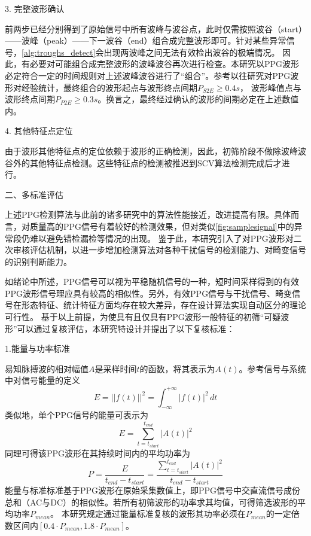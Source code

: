 3. 完整波形确认

前两步已经分别得到了原始信号中所有波峰与波谷点，此时仅需按照波谷（start）——波峰（peak）——下一波谷（end）组合成完整波形即可。针对某些异常信号，\autoref{alg:troughs_detect}会出现两波峰之间无法有效检出波谷的极端情况。
因此，有必要对可能组合成完整波形的波峰波谷再次进行检查。本研究以PPG波形必定符合一定的时间规则对上述波峰波谷进行了“组合”。参考以往研究对PPG波形对经验统计，最终组合的波形起点与波形终点间期$P_{S2E}\ge 0.4s$，
波形峰值点与波形终点间期$P_{P2E}\ge 0.3s$。换言之，最终经过确认的波形的间期必定在上述数值内。

4. 其他特征点定位

由于波形其他特征点的定位依赖于波形的正确检测，因此，初筛阶段不做除波峰波谷外的其他特征点检测。这些特征点的检测被推迟到SCV算法检测完成后才进行。

二、多标准评估

上述PPG检测算法与此前的诸多研究中的算法性能接近，改进提高有限。具体而言，对质量高的PPG信号有着较好的检测效果，但对类似\autoref{fig:samplesignal}中的异常段仍难以避免错检漏检等情况的出现。
鉴于此，本研究引入了对PPG波形对二次审核评估机制，以进一步增加检测算法对各种干扰信号的检测能力、对畸变信号的识别判断能力。

如绪论中所述，PPG信号可以视为平稳随机信号的一种，短时间采样得到的有效PPG波形信号理应具有较高的相似性\cite{Qiu2012}。另外，有效PPG信号与干扰信号、畸变信号在形态特征、统计特征方面均存在较大差异，存在设计算法实现自动区分的理论可行性。
基于以上前提，为使具有且仅具有PPG波形一般特征的初筛“可疑波形”可以通过复核评估，本研究特设计并提出了以下复核标准：

1.能量与功率标准

易知脉搏波的相对幅值$A$是采样时间$t$的函数，将其表示为$A(t)$。参考信号与系统中对信号能量的定义\cite{Alan2019}
\begin{equation}
    \label{equ:energy}
    E=||f(t)||^2=\int_{-\infty}^{+\infty}{|f(t)|^2}\,d t
\end{equation}
类似地，单个PPG信号的能量可表示为
\begin{equation}
    \label{equ:ppge}
    E=\sum_{t=t_{start}}^{t_{end}}|A(t)|^2
\end{equation}
同理可得该PPG波形在其持续时间内的平均功率为
\begin{equation}
    \label{equ:ppgp}
    P=\frac{E}{t_{end}-t_{start}}=\frac{\sum_{t=t_{start}}^{t_{end}}|A(t)|^2}{t_{end}-t_{start}}
\end{equation}
能量与标准标准基于PPG波形在原始采集数值上，即PPG信号中交直流信号成份总和（AC与DC）的相似性。若所有初筛波形的功率求其均值，可得筛选波形的平均功率$P_{mean}$。
本研究规定通过能量标准复核的波形其功率必须在$P_{mean}$的一定倍数区间内$[0.4 \cdot P_{mean},1.8 \cdot P_{mean}]$。

